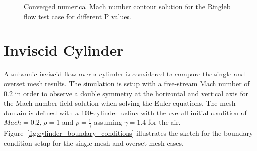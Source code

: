 \begin{figure}[H]
{		\label{fig:ringleb_mach_4}
    }
    \caption{Converged numerical Mach number contour solution for the Ringleb flow test case for different P values.}
    \label{fig:ringleb_mach}
\end{figure}

\section{Inviscid Cylinder}

A subsonic inviscid flow over a cylinder is considered to compare the single and overset mesh results. The simulation is setup with a free-stream Mach number of 0.2 in order to observe a double symmetry at the horizontal and vertical axis for the Mach number field solution when solving the Euler equations. The mesh domain is defined with a 100-cylinder radius with the overall initial condition of $Mach=0.2$, $\rho=1$ and $p=\frac{1}{\gamma}$ assuming $\gamma=1.4$ for the air. Figure\ \ref{fig:cylinder_boundary_conditions} illustrates the sketch for the boundary condition setup for the single mesh and overset mesh cases.

